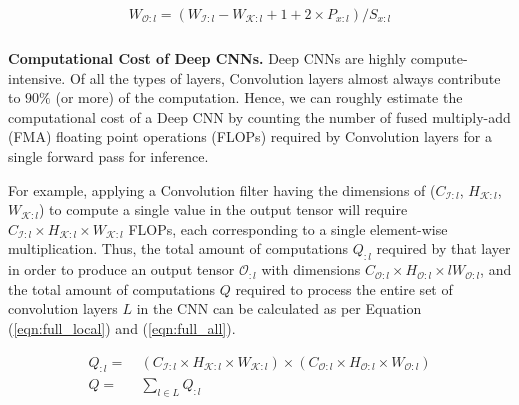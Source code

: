\begin{align}
\begin{split}
W_{\mathcal{O}:l} = (W_{\mathcal{I}:l} - W_{\mathcal{K}:l} + 1 + 2\times P_{x:l})/S_{x:l} \\
\end{split}
\end{align}

\vspace{2mm}
\noindent \textbf{Computational Cost of Deep CNNs.}
Deep CNNs are highly compute-intensive.
Of all the types of layers, Convolution layers almost always contribute to $90\%$ (or more) of the computation.
Hence, we can roughly estimate the computational cost of a Deep CNN by counting the number of fused multiply-add (FMA) floating point operations (FLOPs) required by Convolution layers for a single forward pass for inference.

For example, applying a Convolution filter having the dimensions of ($C_{\mathcal{I}:l}$, $H_{\mathcal{K}:l}$, $W_{\mathcal{K}:l}$) to compute a single value in the output tensor will require $C_{\mathcal{I}:l} \times H_{\mathcal{K}:l} \times W_{\mathcal{K}:l}$ FLOPs, each corresponding to a single element-wise multiplication.
Thus, the total amount of computations $Q_{:l}$ required by that layer in order to produce an output tensor $\mathcal{O}_{:l}$ with dimensions $C_{\mathcal{O}:l} \times H_{\mathcal{O}:l} \times lW_{\mathcal{O}:l}$, and the total amount of computations $Q$ required to process the entire set of convolution layers $L$ in the CNN can be calculated as per Equation (\ref{eqn:full_local}) and (\ref{eqn:full_all}).

\begin{align}
\label{eqn:full_local}
Q_{:l} =&~ (C_{\mathcal{I}:l} \times H_{\mathcal{K}:l} \times W_{\mathcal{K}:l}) \times (C_{\mathcal{O}:l} \times H_{\mathcal{O}:l} \times W_{\mathcal{O}:l})\\
\label{eqn:full_all}
Q =&~ \sum_{l \in L}Q_{:l}
\end{align}


